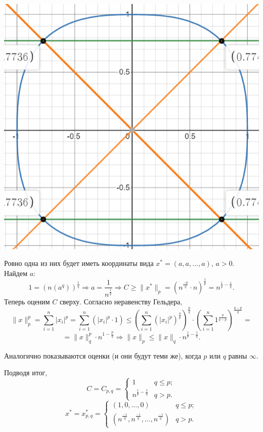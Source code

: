 \documentclass{article}
\begin{document}
\vspace{2mm}
\begin{center}
\includegraphics[scale = 0.8]{p_norms.png}
\end{center}
\vspace{2mm}

Ровно одна из них будет иметь координаты вида $x^* = (a,a,...,a), \, a > 0.$ Найдем $a$:
$$ 1 = (n(a^q))^\frac{1}{q} \Rightarrow a = \frac{1}{n^\frac{1}{q}} \Rightarrow C \geq \|x^*\|_p = \left(n^{\frac{-p}{q}} \cdot n\right)^{\frac{1}{p}} = n^{\frac{1}{p}-\frac{1}{q}}. $$
Теперь оценим $C$ сверху. Согласно неравенству Гельдера, 
$$ \|x\|_p^p = \sum\limits_{i=1}^n|x_i|^p = \sum\limits_{i=1}^n(|x_i|^p \cdot 1) \leq \left(\sum\limits_{i=1}^n(|x_i|^p)^{\frac{q}{p}}\right)^{\frac{p}{q}} \cdot \left(\sum\limits_{i=1}^n 1^{\frac{q}{q-p}}\right)^{\frac{q-p}{q}} = $$
$$ = \|x\|_q^p \cdot n^{1-\frac{p}{q}} \Rightarrow \|x\|_p \leq \|x\|_q \cdot n^{\frac{1}{p}-\frac{1}{q}}. $$

Аналогично показываются оценки (и они будут теми же), когда $p$ или $q$ равны $\infty$.

Подводя итог, 
\begin{equation*} C = C_{p,q} = 
	\begin{cases}
		1 & q \leq p; \\
		n^{\frac{1}{p}-\frac{1}{q}} & q > p.
	\end{cases}
\end{equation*}
\begin{equation*} x^* = x_{p,q}^* = 
	\begin{cases}
		(1,0,...,0) & q \leq p; \\
		\left(n^{\frac{-1}{q}}, n^{\frac{-1}{q}},..., n^{\frac{-1}{q}} \right) & q > p.
	\end{cases}
\end{equation*}
\end{document}
